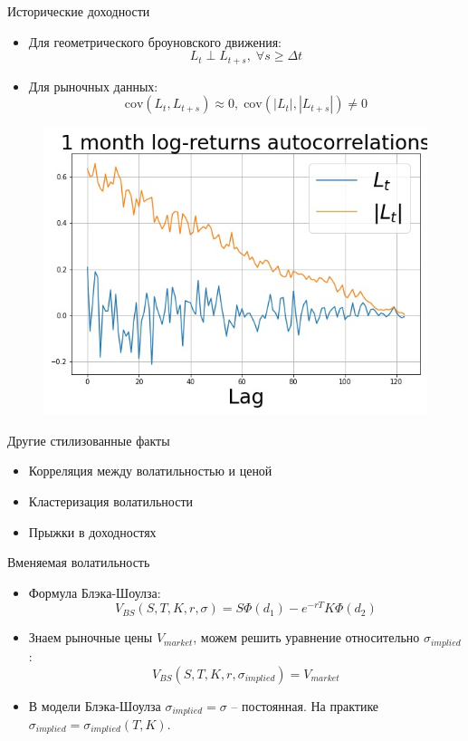 \documentclass{beamer}
\begin{document}
\begin{frame}{Исторические доходности}
    \begin{itemize}
        \item Для геометрического броуновского движения:
        $$
            L_t \perp L_{t + s}, \; \forall s \geq \Delta t
        $$
        \item Для рыночных данных:
        $$
            \mathrm{cov}(L_t, L_{t+s}) \approx 0, \;
            \mathrm{cov}(|L_t|, |L_{t+s}|) \neq 0
        $$ 
    \end{itemize}
    \begin{figure}
    \centering
    \includegraphics[width=0.65\linewidth]{10_figs/autocorrelation.jpg}
    \label{fig:enter-label}
\end{figure}
\end{frame}

\begin{frame}{Другие стилизованные факты}
    \begin{itemize}
        \item Корреляция между волатильностью и ценой
        \item Кластеризация волатильности
        \item Прыжки в доходностях
    \end{itemize}
\end{frame}

\begin{frame}{Вменяемая волатильность}
    \begin{itemize}
        \item Формула Блэка-Шоулза:
        $$
            V_{BS}(S, T, K, r, \sigma) = S \Phi(d_1) - e^{-rT} K \Phi(d_2)
        $$
        \item Знаем рыночные цены $V_{market}$, можем решить уравнение относительно $\sigma_{implied}$:
        $$
            V_{BS}(S, T, K, r, \sigma_{implied}) = V_{market}
        $$
        \item В модели Блэка-Шоулза $\sigma_{implied} = \sigma$ -- постоянная. На практике $\sigma_{implied} = \sigma_{implied}(T, K)$.
    \end{itemize}
\end{frame}
\end{document}
